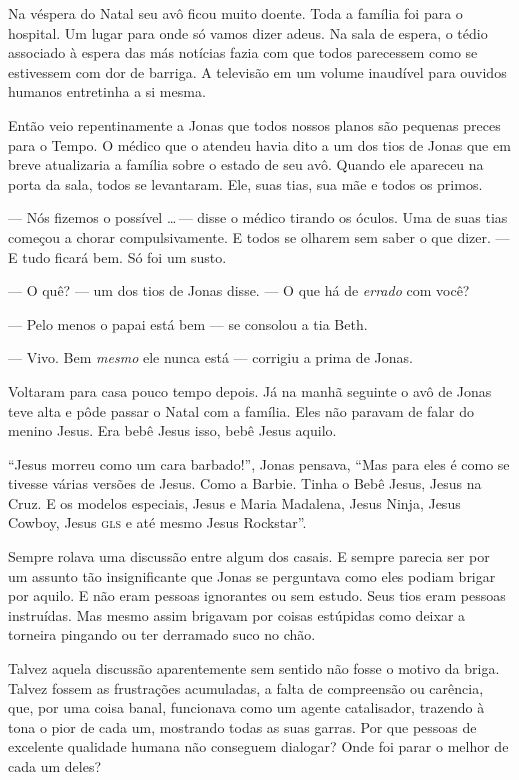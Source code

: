 Na véspera do Natal seu avô ficou muito doente. Toda a família foi para o hospital. Um lugar para onde só vamos dizer adeus. Na sala de espera, o tédio associado à espera das más notícias fazia com que todos parecessem como se estivessem com dor de barriga. A televisão em um volume inaudível para ouvidos humanos entretinha a si mesma.

Então veio repentinamente a Jonas que todos nossos planos são pequenas preces para o Tempo. O médico que o atendeu havia dito a um dos tios de Jonas que em breve atualizaria a família sobre o estado de seu avô. Quando ele apareceu na porta da sala, todos se levantaram. Ele, suas tias, sua mãe e todos os primos.

--- Nós fizemos o possível \ldots\,--- disse o médico tirando os óculos. Uma de suas tias começou a chorar compulsivamente. E todos se olharem sem saber o que dizer. --- E tudo ficará bem. Só foi um susto.

--- O quê? --- um dos tios de Jonas disse. --- O que há de \emph{errado} com você?

--- Pelo menos o papai está bem --- se consolou a tia Beth.

--- Vivo. Bem \emph{mesmo} ele nunca está --- corrigiu a prima de Jonas.

Voltaram para casa pouco tempo depois. Já na manhã seguinte o avô de Jonas teve alta e pôde passar o Natal com a família. Eles não paravam de falar do menino Jesus. Era bebê Jesus isso, bebê Jesus aquilo.

``Jesus morreu como um cara barbado!'', Jonas pensava, ``Mas para eles é como se tivesse várias versões de Jesus. Como a Barbie. Tinha o Bebê Jesus, Jesus na Cruz. E os modelos especiais, Jesus e Maria Madalena, Jesus Ninja, Jesus Cowboy, Jesus \textsc{gls} e até mesmo Jesus Rockstar''.

Sempre rolava uma discussão entre algum dos casais. E sempre parecia ser por um assunto tão insignificante que Jonas se perguntava como eles podiam brigar por aquilo. E não eram pessoas ignorantes ou sem estudo. Seus tios eram pessoas instruídas. Mas mesmo assim brigavam por coisas estúpidas como deixar a torneira pingando ou ter derramado suco no chão.

Talvez aquela discussão aparentemente sem sentido não fosse o motivo da briga. Talvez fossem as frustrações acumuladas, a falta de compreensão ou carência, que, por uma coisa banal, funcionava como um agente catalisador, trazendo à tona o pior de cada um, mostrando todas as suas garras. Por que pessoas de excelente qualidade humana não conseguem dialogar? Onde foi parar o melhor de cada um deles?

